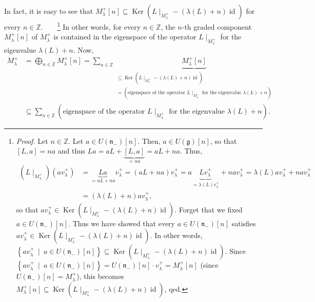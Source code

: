 \documentclass
[numbers=enddot,12pt,final,onecolumn,german,notitlepage]{scrartcl}%
\theoremstyle{definition}
\begin{document}
In fact, it is easy to see that $M_{\lambda}^{+}\left[  n\right]
\subseteq\operatorname*{Ker}\left(  L\mid_{M_{\lambda}^{+}}-\left(
\lambda\left(  L\right)  +n\right)  \operatorname*{id}\right)  $ for every
$n\in\mathbb{Z}$.\ \ \ \ \footnote{\textit{Proof.} Let $n\in\mathbb{Z}$. Let
$a\in U\left(  \mathfrak{n}_{-}\right)  \left[  n\right]  $. Then, $a\in
U\left(  \mathfrak{g}\right)  \left[  n\right]  $, so that $\left[
L,a\right]  =na$ and thus $La=aL+\underbrace{\left[  L,a\right]  }%
_{=na}=aL+na$. Thus,%
\begin{align*}
\left(  L\mid_{M_{\lambda}^{+}}\right)  \left(  av_{\lambda}^{+}\right)   &
=\underbrace{La}_{=aL+na}v_{\lambda}^{+}=\left(  aL+na\right)  v_{\lambda}%
^{+}=a\underbrace{Lv_{\lambda}^{+}}_{=\lambda\left(  L\right)  v_{\lambda}%
^{+}}+nav_{\lambda}^{+}=\lambda\left(  L\right)  av_{\lambda}^{+}%
+nav_{\lambda}^{+}\\
&  =\left(  \lambda\left(  L\right)  +n\right)  av_{\lambda}^{+},
\end{align*}
so that $av_{\lambda}^{+}\in\operatorname*{Ker}\left(  L\mid_{M_{\lambda}^{+}%
}-\left(  \lambda\left(  L\right)  +n\right)  \operatorname*{id}\right)  $.
Forget that we fixed $a\in U\left(  \mathfrak{n}_{-}\right)  \left[  n\right]
$. Thus we have showed that every $a\in U\left(  \mathfrak{n}_{-}\right)
\left[  n\right]  $ satisfies $av_{\lambda}^{+}\in\operatorname*{Ker}\left(
L\mid_{M_{\lambda}^{+}}-\left(  \lambda\left(  L\right)  +n\right)
\operatorname*{id}\right)  $. In other words, $\left\{  av_{\lambda}^{+}%
\ \mid\ a\in U\left(  \mathfrak{n}_{-}\right)  \left[  n\right]  \right\}
\subseteq\operatorname*{Ker}\left(  L\mid_{M_{\lambda}^{+}}-\left(
\lambda\left(  L\right)  +n\right)  \operatorname*{id}\right)  $. Since
$\left\{  av_{\lambda}^{+}\ \mid\ a\in U\left(  \mathfrak{n}_{-}\right)
\left[  n\right]  \right\}  =U\left(  \mathfrak{n}_{-}\right)  \left[
n\right]  \cdot v_{\lambda}^{+}=M_{\lambda}^{+}\left[  n\right]  $ (since
$U\left(  \mathfrak{n}_{-}\right)  \left[  n\right]  =M_{\lambda}^{+}$), this
becomes $M_{\lambda}^{+}\left[  n\right]  \subseteq\operatorname*{Ker}\left(
L\mid_{M_{\lambda}^{+}}-\left(  \lambda\left(  L\right)  +n\right)
\operatorname*{id}\right)  $, qed.} In other words, for every $n\in\mathbb{Z}%
$, the $n$-th graded component $M_{\lambda}^{+}\left[  n\right]  $ of
$M_{\lambda}^{+}$ is contained in the eigenspace of the operator
$L\mid_{M_{\lambda}^{+}}$ for the eigenvalue $\lambda\left(  L\right)  +n$.
Now,%
\begin{align*}
M_{\lambda}^{+}  &  =\bigoplus\limits_{n\in\mathbb{Z}}M_{\lambda}^{+}\left[
n\right]  =\sum\limits_{n\in\mathbb{Z}}\underbrace{M_{\lambda}^{+}\left[
n\right]  }_{\substack{\subseteq\operatorname*{Ker}\left(  L\mid_{M_{\lambda
}^{+}}-\left(  \lambda\left(  L\right)  +n\right)  \operatorname*{id}\right)
\\=\left(  \text{eigenspace of the operator }L\mid_{M_{\lambda}^{+}}\text{ for
the eigenvalue }\lambda\left(  L\right)  +n\right)  }}\\
&  \subseteq\sum\limits_{n\in\mathbb{Z}}\left(  \text{eigenspace of the
operator }L\mid_{M_{\lambda}^{+}}\text{ for the eigenvalue }\lambda\left(
L\right)  +n\right)  .
\end{align*}
\end{document}
